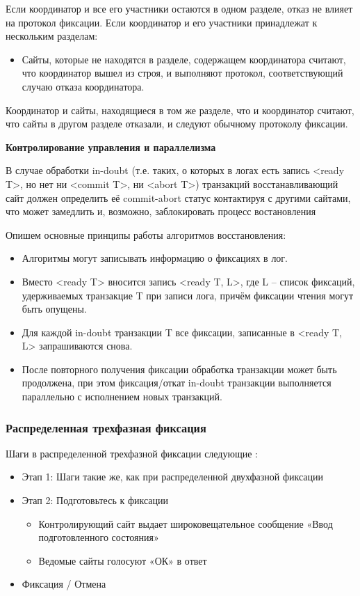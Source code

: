 \begin{itemize}
Если координатор и все его участники остаются в одном разделе, отказ не влияет на протокол фиксации. %
Если координатор и его участники принадлежат к нескольким разделам:
\begin{itemize}
\item Сайты, которые не находятся в разделе, содержащем координатора считают, что координатор вышел из строя, и выполняют протокол, соответствующий случаю отказа координатора.

\end{itemize}
Координатор и сайты, находящиеся в том же разделе, что и координатор считают, что сайты в другом разделе отказали, и следуют обычному протоколу фиксации.


\end{itemize}

\bigbreak
\textbf{Контролирование управления и параллелизма}

В случае обработки in-doubt (т.е. таких, о которых в логах есть запись <ready T>, но нет ни <commit T>, ни <abort T>) транзакций восстанавливающий сайт должен определить её commit-abort статус контактируя с другими сайтами, что может замедлить и, возможно, заблокировать процесс востановления %

Опишем основные принципы работы алгоритмов восстановления:
\begin{itemize}
    \item Алгоритмы могут записывать информацию о фиксациях в лог.
    \item Вместо <ready T> вносится запись <ready T, L>, где L -- список фиксаций, удерживаемых транзакцие T при записи лога, причём фиксации чтения могут быть опущены.
    \item Для каждой in-doubt транзакции T все фиксации, записанные в <ready T, L> запрашиваются снова.
    \item После повторного получения фиксации обработка транзакции может быть продолжена, при этом фиксация/откат in-doubt транзакции выполняется параллельно с исполнением новых транзакций.
\end{itemize}

\bigbreak
\subsubsection{Распределенная трехфазная фиксация}

Шаги в распределенной трехфазной фиксации следующие \autocite{FixProtocols}:
\begin{itemize}
    \item Этап 1: Шаги такие же, как при распределенной двухфазной фиксации
    \item Этап 2: Подготовьтесь к фиксации
    \begin{itemize}
        \item Контролирующий сайт выдает широковещательное сообщение «Ввод подготовленного состояния»
        \item Ведомые сайты голосуют «ОК» в ответ
    \end{itemize}
    \item Фиксация / Отмена
\end{itemize}

